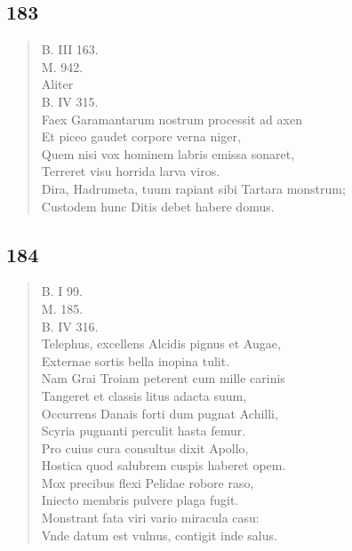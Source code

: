 \documentclass[11pt, a4paper]{report}
\begin{document}
            \subsection*{183}
      \begin{verse}
      B. III 163. \\ M. 942. \\ Aliter \\ B. IV 315. \\ Faex Garamantarum nostrum processit ad axen \\ Et piceo gaudet corpore verna niger, \\ 
        ﻿\pagebreak 
    Quem nisi vox hominem labris emissa sonaret, \\ Terreret visu horrida larva viros. \\ Dira, Hadrumeta, tuum rapiant sibi Tartara monstrum; \\ Custodem hunc Ditis debet habere domus. \\ 
      \end{verse}
  
            \subsection*{184}
      \begin{verse}
      B. I 99. \\ M. 185. \\ B. IV 316. \\ Telephus, excellens Alcidis pignus et Augae, \\ Externae sortis bella inopina tulit. \\ Nam Grai Troiam peterent cum mille carinis \\ Tangeret et classis litus adacta suum, \\ Occurrens Danais forti dum pugnat Achilli, \\ Scyria pugnanti perculit hasta femur. \\ Pro cuius cura consultus dixit Apollo, \\ Hostica quod salubrem cuspis haberet opem. \\ Mox precibus flexi Pelidae robore raso, \\ Iniecto membris pulvere plaga fugit. \\ Monstrant fata viri vario miracula casu: \\ Vnde datum est vulnus, contigit inde salus. \\ 
      \end{verse}
  
\end{document}
